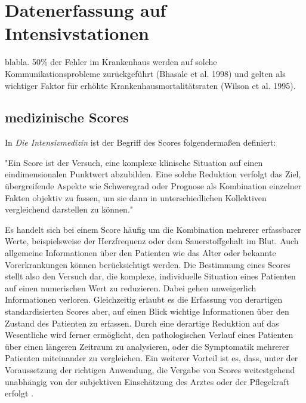 \section{Datenerfassung auf Intensivstationen}

blabla. 50\% der Fehler im Krankenhaus werden auf solche Kommunikationsprobleme zurückgeführt (Bhasale et al. 1998) und gelten als wichtiger Faktor für erhöhte Krankenhausmortalitätsraten (Wilson et al. 1995).

\subsection{medizinische Scores} \label{section:scores}

In \textit{Die Intensivmedizin} \citep{marxIntensivmedizin2015c} ist der Begriff des Scores folgendermaßen definiert:

\begin{itquote}
    "Ein Score ist der Versuch, eine komplexe klinische Situation auf einen eindimensionalen Punktwert abzubilden. Eine solche Reduktion verfolgt das Ziel, übergreifende Aspekte wie Schweregrad oder Prognose als Kombination einzelner Fakten objektiv zu fassen, um sie dann in unterschiedlichen Kollektiven vergleichend darstellen zu können."
\end{itquote}

Es handelt sich bei einem Score häufig um die Kombination mehrerer erfassbarer Werte, beispielsweise der Herzfrequenz oder dem Sauerstoffgehalt im Blut. Auch allgemeine Informationen über den Patienten wie das Alter oder bekannte Vorerkrankungen können berücksichtigt werden. Die Bestimmung eines Scores stellt also den Versuch dar, die komplexe, individuelle Situation eines Patienten auf einen numerischen Wert zu reduzieren. Dabei gehen unweigerlich Informationen verloren. Gleichzeitig erlaubt es die Erfassung von derartigen standardisierten Scores aber, auf einen Blick wichtige Informationen über den Zustand des Patienten zu erfassen. Durch eine derartige Reduktion auf das Wesentliche wird ferner ermöglicht, den pathologischen Verlauf eines Patienten über einen längeren Zeitraum zu analysieren, oder die Symptomatik mehrerer Patienten miteinander zu vergleichen. Ein weiterer Vorteil ist es, dass, unter der Voraussetzung der richtigen Anwendung, die Vergabe von Scores weitestgehend unabhängig von der subjektiven Einschätzung des Arztes oder der Pflegekraft erfolgt \citep{marxIntensivmedizin2015c}.


